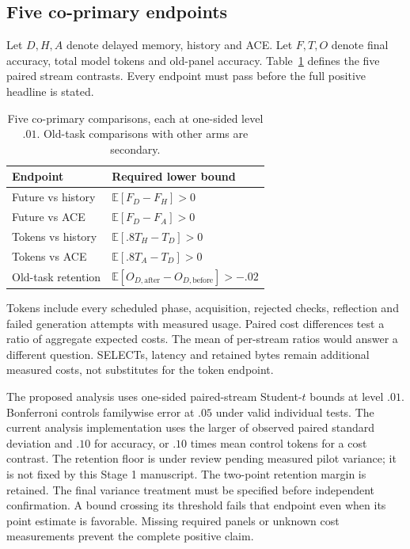 \documentclass[10pt,twocolumn]{article}
\newcommand{\E}{\mathbb E}
\begin{document}
\subsection{Five co-primary endpoints}
Let $D,H,A$ denote delayed memory, history and ACE. Let $F,T,O$ denote final
accuracy, total model tokens and old-panel accuracy. Table~\ref{tab:endpoints}
defines the five paired stream contrasts. Every endpoint must pass before the
full positive headline is stated.
\begin{table}[t]
\centering\small\setlength{\tabcolsep}{3pt}
\begin{tabular}{p{}p{}}
\toprule Endpoint & Required lower bound\\\midrule
Future vs history & $\E[F_D-F_H]>0$\\
Future vs ACE & $\E[F_D-F_A]>0$\\
Tokens vs history & $\E[.8T_H-T_D]>0$\\
Tokens vs ACE & $\E[.8T_A-T_D]>0$\\
Old-task retention & $\E[O_{D,\mathrm{after}}-O_{D,\mathrm{before}}]>-.02$\\
\bottomrule\end{tabular}
\caption{Five co-primary comparisons, each at one-sided level $.01$. Old-task
comparisons with other arms are secondary.}\label{tab:endpoints}
\end{table}

Tokens include every scheduled phase, acquisition, rejected checks, reflection
and failed generation attempts with measured usage. Paired cost differences
test a ratio of aggregate expected costs. The mean of per-stream ratios would
answer a different question. SELECTs, latency and retained bytes remain
additional measured costs, not substitutes for the token endpoint.

The proposed analysis uses one-sided paired-stream Student-$t$ bounds at level
$.01$. Bonferroni controls familywise error at $.05$ under valid individual
tests. The current analysis implementation uses the larger of observed paired
standard deviation and $.10$ for accuracy, or $.10$ times mean control tokens
for a cost contrast. The retention floor is under review pending measured
pilot variance; it is not fixed by this Stage 1 manuscript. The two-point
retention margin is retained. The final variance treatment must be specified
before independent confirmation. A bound crossing its threshold fails that
endpoint even when its point estimate is favorable. Missing required panels or
unknown cost measurements prevent the complete positive claim.
\end{document}

